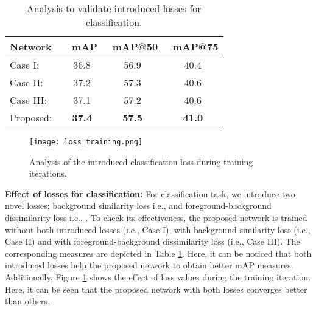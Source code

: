 \documentclass[10pt,twocolumn,letterpaper]{article}
\begin{document}
\begin{table}[t!]
\centering
\caption{Analysis to validate introduced losses for classification.} \label{abl:loss}\vspace{-0.5em}
\begin{adjustbox}{width=.99\linewidth,center}
\begin{tabular}{l|ccc}
\cline{1-4}
\textbf{Network}                                              &\, \textbf{mAP}  & \, \textbf{mAP@50} &\, \textbf{mAP@75} \\ \hline 
Case I:\qquad                     & 36.8 & 56.9   & 40.4   \\
Case II: \quad\                & 37.2 & 57.3   & 40.6   \\
Case III: \quad  & 37.1 & 57.2   & 40.6   \\
Proposed: \,                                        & \textbf{37.4} & \textbf{57.5}   & \textbf{41.0}   \\ \hline 
\end{tabular}
\end{adjustbox}
\end{table}
\begin{figure}[t!]
    \centering
    \texttt{[image: loss\_training.png]}
\vspace{-0.5em}
    \caption{Analysis of the introduced classification loss during training iterations. }
    \label{fig:loss-training}
\end{figure}
\textbf{Effect of losses for classification:} For classification task, we introduce two novel losses; background similarity loss i.e.,  and foreground-background dissimilarity loss i.e., . To check its effectiveness, the proposed network is trained without both introduced losses (i.e., Case I), with background similarity loss (i.e., Case II) and with foreground-background dissimilarity loss (i.e., Case III). The corresponding measures are depicted in Table \ref{abl:loss}. Here, it can be noticed that both introduced losses help the proposed network to obtain better mAP measures. Additionally, Figure \ref{fig:loss-training} shows the effect of loss values during the training iteration. Here, it can be seen that the proposed network with both losses converges better than others. 
\end{document}

